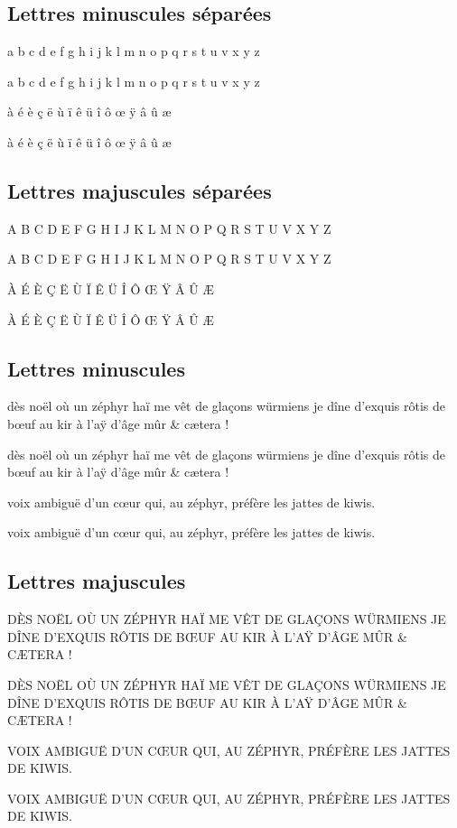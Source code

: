 \documentclass[a4paper,10pt]{article}
\begin{document}
\subsection{Lettres minuscules séparées}

{\Reference a b c d e f g h i j k l m n o p q r s t u v x y z}

{\Fontify a b c d e f g h i j k l m n o p q r s t u v x y z}


{\Reference à é è ç ë ù ï ê ü î ô œ ÿ â û æ}

{\Fontify à é è ç ë ù ï ê ü î ô œ ÿ â û æ}


\subsection{Lettres majuscules séparées}

{\Reference A B C D E F G H I J K L M N O P Q R S T U V X Y Z}

{\Fontify A B C D E F G H I J K L M N O P Q R S T U V X Y Z}


{\Reference À É È Ç Ë Ù Ï Ê Ü Î Ô Œ Ÿ Â Û Æ}

{\Fontify À É È Ç Ë Ù Ï Ê Ü Î Ô Œ Ÿ Â Û Æ}


\subsection{Lettres minuscules}

{\Reference dès noël où un zéphyr haï me vêt de glaçons würmiens je dîne d’exquis rôtis de bœuf au kir à l’aÿ d’âge mûr \& cætera !}

{\Fontify dès noël où un zéphyr haï me vêt de glaçons würmiens je dîne d’exquis rôtis de bœuf au kir à l’aÿ d’âge mûr \& cætera !}


{\Reference voix ambiguë d'un cœur qui, au zéphyr, préfère les jattes de kiwis.}

{\Fontify voix ambiguë d'un cœur qui, au zéphyr, préfère les jattes de kiwis.}


\subsection{Lettres majuscules}

{\Reference DÈS NOËL OÙ UN ZÉPHYR HAÏ ME VÊT DE GLAÇONS WÜRMIENS JE DÎNE D’EXQUIS RÔTIS DE BŒUF AU KIR À L’AŸ D’ÂGE MÛR \& CÆTERA !}

{\Fontify DÈS NOËL OÙ UN ZÉPHYR HAÏ ME VÊT DE GLAÇONS WÜRMIENS JE DÎNE D’EXQUIS RÔTIS DE BŒUF AU KIR À L’AŸ D’ÂGE MÛR \& CÆTERA !}


{\Reference VOIX AMBIGUË D'UN CŒUR QUI, AU ZÉPHYR, PRÉFÈRE LES JATTES DE KIWIS.}

{\Fontify VOIX AMBIGUË D'UN CŒUR QUI, AU ZÉPHYR, PRÉFÈRE LES JATTES DE KIWIS.}
\end{document}
